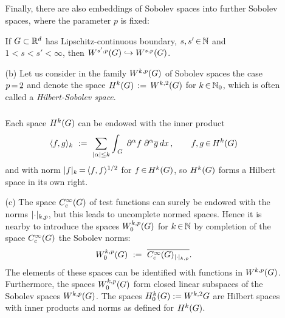 \documentclass[11pt,twoside]{article}
\begin{document}
\begin{itemize}[leftmargin=12pt,itemsep=5pt]
\begin{itemize}[leftmargin=17pt]
\subparagraph{} %
Finally,
there are also embeddings of Sobolev spaces into further Sobolev spaces,
where the parameter $p$ is fixed:

\begin{theorem1}\label{I_SOBOLEV_EMBEDDING_THEOREM_3}
If $\G \subset \Rd$ has Lipschitz-continuous boundary,
$s,s' \xeof \N$ and $1 < s < s' < \infty$,
then $W^{s',p}(\G) \hookrightarrow W^{s,p}(\G)$.
\end{theorem1}

\item[(b)] Let us consider in the family $W^{k,p}(G)$ of Sobolev spaces
the case $p {\,=\,} 2$ and denote the space $H^k(G) \,:=\, W^{k,2}(G)$
for $k {\,\in\,} {\mathbb{N}}_0$,
which is often called a \textit{Hilbert-Sobolev space}.

\subparagraph{} %
Each space $H^k(G)$ can be endowed with the inner product
\[
\scalar{f}{g}_k \, \eqdef \,
\sum_{\abs{\alpha} \leq k} \int_{\,\G} \;
\PA f \; \PA \overline{g} \, dx\,,
\quad \quad f,g \xeof H^k(\G)
\]
and with norm
$\abs{f} _k \eq \scalar{f}{f}^{1/2}$ for $f {\,\in\,} H^k(G)$,
so $H^k(G)$ forms a Hilbert space in its own right.

\item[(c)] The space $C_c^{\infty}(G)$ of test functions can surely be endowed
with the norms $\abs{\cdot} _{k,p}$,
but this leads to uncomplete normed spaces.
Hence it is nearby to introduce the spaces $W_0^{k,p}(G)$ for $k {\,\in\,} {\mathbb{N}}$
by completion of the space $C_c^{\infty}(G)$ {\wrt} the Sobolev norms:
\[
\WN{k,p}{\G} \, \eqdef \, \overline{\TF_{\abs{\cdot} _{k,p}}}.
\]
The elements of these spaces can be identified with functions in $W^{k,p}(G)$.
Furthermore,
the spaces $W_0^{k,p}(G)$ form closed linear subspaces
of the Sobolev spaces $W^{k,p}(G)$.
The spaces $H_0^{k}(G) := W^{k,2}{G}$ are Hilbert spaces
with inner products and norms as defined for $H^k(G)$.
\end{itemize}
\end{itemize}

\end{document}
